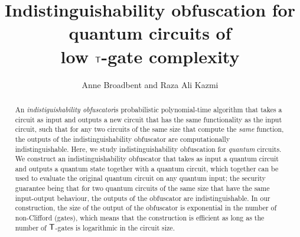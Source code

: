 \documentclass[english,11pt]{article}
\title{Indistinguishability obfuscation for \\quantum circuits of \\  low ${\sf T}$-gate complexity}
\author{Anne Broadbent and Raza Ali Kazmi}
\affil{University of Ottawa, Department of Mathematics and Statistics,\\\texttt{\{abroadbe,rkazmi\}@uottawa.ca.}}
\date{} %
\begin{document}
\maketitle

\begin{abstract}
An \emph{indistiguishability obfuscator}is probabilistic polynomial-time algorithm that takes a circuit as input
and outputs a new circuit  that has the same functionality as the input circuit, such that  for any two circuits of the same size that compute the \emph{same} function, the outputs of the indistinguishability obfuscator are computationally indistinguishable. Here, we study indistinguishability obfuscation for \emph{quantum} circuits. We construct an indistinguishability  obfuscator that takes as input a quantum circuit and outputs a quantum state together with a quantum circuit, which together can be used to evaluate the original quantum circuit on any quantum input; the security guarantee being that for two quantum circuits of the same size that have the same input-output behaviour, the outputs of the obfuscator are indistinguishable. In our construction, the size of the output of the obfuscator is exponential in the number of non-Clifford (\tgate gates), which means that the construction is efficient as long as the number of ${\sf T}$-gates  is logarithmic in the circuit size.
\end{abstract}

\newpage

\setcounter{tocdepth}{2}
\tableofcontents
\clearpage
{}
\setcounter{page}{1}







%


\end{document}

